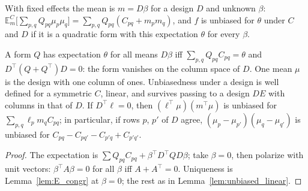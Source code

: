 \begin{definition}\label{def:unbiased_mean}
  \leanok
  With fixed effects the mean is $m = D\beta$ for a design $D$ and unknown $\beta$:
  $\mathbb{E}^{C}_{m}\bigl[\sum_{p,q} Q_{pq}\mu_p\mu_q\bigr] = \sum_{p,q} Q_{pq}(C_{pq} + m_pm_q)$,
  and $f$ is unbiased for $\theta$ under $C$ and $D$ if it is a quadratic form with this
  expectation $\theta$ for every $\beta$.
\end{definition}

\begin{theorem}\label{thm:unbiased_mean}
  \leanok
  A form $Q$ has expectation $\theta$ for all means $D\beta$ iff
  $\sum_{p,q}Q_{pq}C_{pq} = \theta$ and $D^\top(Q + Q^\top)D = 0$: the form vanishes on the
  column space of $D$. One mean $\mu$ is the design with one column of ones. Unbiasedness
  under a design is well defined for a symmetric $C$, linear, and survives passing to a
  design $DE$ with columns in that of $D$. If $D^\top\ell = 0$, then $(\ell^\top\mu)(m^\top\mu)$
  is unbiased for $\sum_{p,q}\ell_pm_qC_{pq}$; in particular, if rows $p$, $p'$ of $D$ agree,
  $(\mu_p - \mu_{p'})(\mu_q - \mu_{q'})$ is unbiased for
  $C_{pq} - C_{pq'} - C_{p'q} + C_{p'q'}$.
\end{theorem}
\begin{proof}
  \leanok
  The expectation is $\sum Q_{pq}C_{pq} + \beta^\top D^\top QD\beta$; take $\beta = 0$, then
  polarize with unit vectors: $\beta^\top A\beta = 0$ for all $\beta$ iff $A + A^\top = 0$.
  Uniqueness is Lemma~\ref{lem:E_congr} at $\beta = 0$; the rest as in
  Lemma~\ref{lem:unbiased_linear}.
\end{proof}

